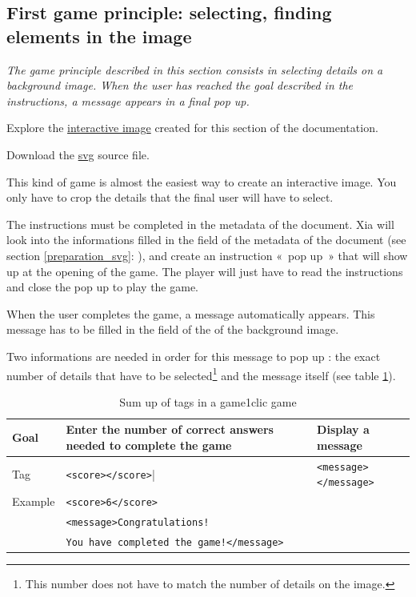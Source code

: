 \subsection{First game principle: selecting, finding elements in the image}\label{game1clicsection}


\textit{The game principle described in this section consists in selecting details 
on a background image. When the user has reached the goal described in the 
instructions, a message appears in a final pop up.}


\begin{links}
Explore the \href{http://xia.dane.ac-versailles.fr/demo/tuto/xia3}{interactive image}
created for this section of the documentation.

Download the \href{http://xia.dane.ac-versailles.fr/demo/tuto/xia3/svg/xia3.svg}{svg} source file.
\end{links}

This kind of game is almost the easiest way to create an interactive image.
You only have to crop the details that the final user will have to select. 

The instructions must be completed in the 
metadata of the document. Xia will look into 
the informations  filled in the  field of the metadata of the document
(see section \ref{preparation_svg}: ), 
and create an instruction «~pop up~» that will show up at the opening of the game. The player 
will just have to read the instructions and close the pop up to play the game.

When the user completes the game, a message automatically appears.
This message has to be filled in the  field of the  of the 
background image. 

Two informations are needed in order for this message to pop up :
the exact number of details that have to be selected\footnote{This number does 
not have to match the number of details on the image.}
and the message itself (see table \ref{tag1_sumup}).

\begin{table}
 \begin{tabular}{|l|p{2in}|p{2in}|}
 \hline
  Goal & Enter the number of correct answers needed to complete the game & Display a message\\
  \hline
  Tag & \texttt{<score></score>}| & \texttt{<message></message>}\\
  \hline
  Example & \multicolumn{2}{|l|}{\texttt{<score>6</score>}}\\
   & \multicolumn{2}{|l|}{\texttt{<message>Congratulations!}}\\
    & \multicolumn{2}{|l|}{\texttt{You have completed the game!</message>}}\\
  \hline
 \end{tabular}
\caption{Sum up of tags in a game1clic game}
\label{tag1_sumup}
\end{table}
 

